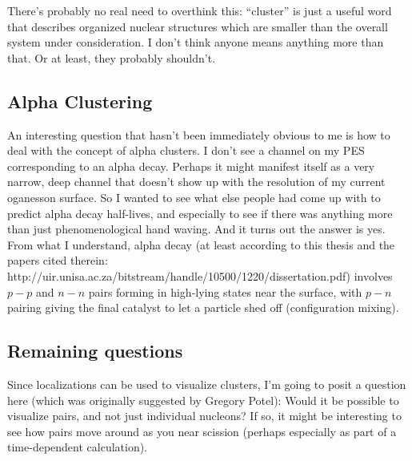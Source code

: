 There's probably no real need to overthink this: ``cluster'' is just a useful word that describes organized nuclear structures which are smaller than the overall system under consideration. I don't think anyone means anything more than that. Or at least, they probably shouldn't.

\subsection*{Alpha Clustering}
An interesting question that hasn't been immediately obvious to me is how to deal with the concept of alpha clusters. I don't see a channel on my PES corresponding to an alpha decay. Perhaps it might manifest itself as a very narrow, deep channel that doesn't show up with the resolution of my current oganesson surface. So I wanted to see what else people had come up with to predict alpha decay half-lives, and especially to see if there was anything more than just phenomenological hand waving. And it turns out the answer is yes. From what I understand, alpha decay (at least according to this thesis and the papers cited therein: http://uir.unisa.ac.za/bitstream/handle/10500/1220/dissertation.pdf) involves $p-p$ and $n-n$ pairs forming in high-lying states near the surface, with $p-n$ pairing giving the final catalyst to let a particle shed off (configuration mixing).

\subsection*{Remaining questions}
Since localizations can be used to visualize clusters, I'm going to posit a question here (which was originally suggested by Gregory Potel): Would it be possible to visualize pairs, and not just individual nucleons? If so, it might be interesting to see how pairs move around as you near scission (perhaps especially as part of a time-dependent calculation).
